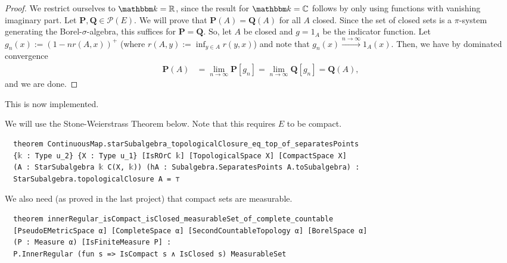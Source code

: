 \documentclass{article}
\theoremstyle{definition}
\theoremstyle{step} \newtheorem{step}{Step}
\begin{document}
\begin{paracol}{2}
  \begin{proof}
    We restrict ourselves to $\mathbbm k = \mathbb R$, since the result
    for $\mathbbm k = \mathbb C$ follows by only using functions with
    vanishing imaginary part. Let $\mathbf P, \mathbf Q \in \mathcal
      P(E)$. We will prove that $\mathbf P(A) = \mathbf Q(A)$ for all $A$
    closed. Since the set of closed sets is a $\pi$-system generating
    the Borel-$\sigma$-algebra, this suffices for $\mathbf P = \mathbf
      Q$. So, let $A$ be closed and $g = 1_A$ be the indicator
    function. Let $g_n(x) := (1 - n r(A,x))^+$ (where $r(A,y) := \inf_{y\in
        A}r(y,x)$) and note that $g_n(x) \xrightarrow{n\to\infty}
      1_A(x)$. Then, we have by dominated convergence
    \begin{align*}
      \mathbf P(A) & = \lim_{n\to\infty} \mathbf P[g_n] =
      \lim_{n\to\infty} \mathbf Q[g_n] = \mathbf Q(A),
    \end{align*}
    and we are done.
  \end{proof}
  \switchcolumn
  This is now implemented.

  \switchcolumn*
  We will use the Stone-Weierstrass Theorem below.
  Note that this requires $E$ to be compact.

  \switchcolumn

  \begin{verbatim}
  theorem ContinuousMap.starSubalgebra_topologicalClosure_eq_top_of_separatesPoints
  {𝕜 : Type u_2} {X : Type u_1} [IsROrC 𝕜] [TopologicalSpace X] [CompactSpace X]
  (A : StarSubalgebra 𝕜 C(X, 𝕜)) (hA : Subalgebra.SeparatesPoints A.toSubalgebra) :
  StarSubalgebra.topologicalClosure A = ⊤
\end{verbatim}

  \switchcolumn*

  We also need (as proved in the last project) that compact sets are measurable.

  \switchcolumn

  \begin{verbatim}
  theorem innerRegular_isCompact_isClosed_measurableSet_of_complete_countable
  [PseudoEMetricSpace α] [CompleteSpace α] [SecondCountableTopology α] [BorelSpace α]
  (P : Measure α) [IsFiniteMeasure P] :
  P.InnerRegular (fun s => IsCompact s ∧ IsClosed s) MeasurableSet
\end{verbatim}


\end{paracol}
\end{document}
